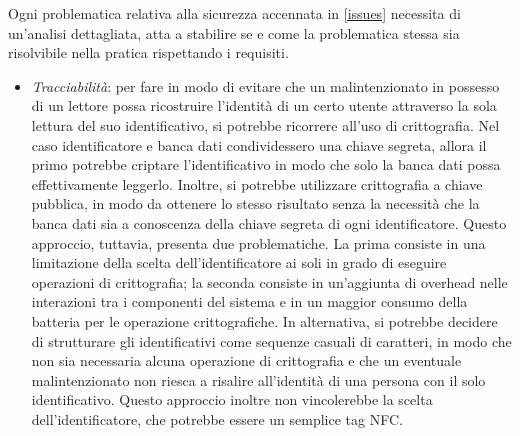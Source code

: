 \documentclass[a4paper,12pt]{report}
\begin{document}
Ogni problematica relativa alla sicurezza accennata in \autoref{issues} necessita di un'analisi dettagliata, atta a stabilire se e come la problematica stessa sia risolvibile nella pratica rispettando i requisiti.
\begin{itemize}
	\item \emph{Tracciabilità}: per fare in modo di evitare che un malintenzionato in possesso di un lettore possa ricostruire l'identità di un certo utente attraverso la sola lettura del suo identificativo, si potrebbe ricorrere all'uso di crittografia. Nel caso identificatore e banca dati condividessero una chiave segreta, allora il primo potrebbe criptare l'identificativo in modo che solo la banca dati possa effettivamente leggerlo. Inoltre, si potrebbe utilizzare crittografia a chiave pubblica, in modo da ottenere lo stesso risultato senza la necessità che la banca dati sia a conoscenza della chiave segreta di ogni identificatore. Questo approccio, tuttavia, presenta due problematiche. La prima consiste in una limitazione della scelta dell'identificatore ai soli in grado di eseguire operazioni di crittografia; la seconda consiste in un'aggiunta di overhead nelle interazioni tra i componenti del sistema e in un maggior consumo della batteria per le operazione crittografiche. In alternativa, si potrebbe decidere di strutturare gli identificativi come sequenze casuali di caratteri, in modo che non sia necessaria alcuna operazione di crittografia e che un eventuale malintenzionato non riesca a risalire all'identità di una persona con il solo identificativo. Questo approccio inoltre non vincolerebbe la scelta dell'identificatore, che potrebbe essere un semplice tag NFC.
	

\end{itemize}
\end{document}
